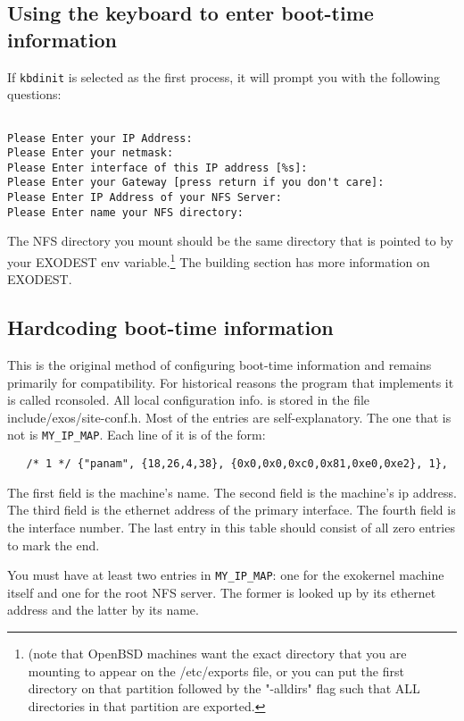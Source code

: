 \documentclass[11pt]{article}
\begin{document}
\subsection{Using the keyboard to enter boot-time information}

If {\tt kbdinit} is selected as the first process, it will prompt
you with the following questions:

\begin{verbatim}

Please Enter your IP Address:
Please Enter your netmask: 
Please Enter interface of this IP address [%s]: 
Please Enter your Gateway [press return if you don't care]: 
Please Enter IP Address of your NFS Server: 
Please Enter name your NFS directory: 

\end{verbatim}

The NFS directory you mount should be the same directory that is
pointed to by your EXODEST env variable.\footnote{(note that OpenBSD
machines want the exact directory that you are mounting to appear on
the /etc/exports file, or you can put the first directory on that
partition followed by the "-alldirs" flag such that ALL directories in
that partition are exported.} The building section has more information
on EXODEST.

\subsection{Hardcoding boot-time information}

This is the original method of configuring boot-time information and
remains primarily for compatibility.  For historical reasons the program
that implements it is called rconsoled. All local configuration info.
is stored in the file include/exos/site-conf.h. Most of the entries
are self-explanatory. The one that is not is {\tt MY\_IP\_MAP}. Each
line of it is of the form:

\begin{verbatim}
   /* 1 */ {"panam", {18,26,4,38}, {0x0,0x0,0xc0,0x81,0xe0,0xe2}, 1},
\end{verbatim}

The first field is the machine's name. The second field is the machine's
ip address. The third field is the ethernet address of the primary
interface. The fourth field is the interface number. The last entry
in this table should consist of all zero entries to mark the end.

You must have at least two entries in {\tt MY\_IP\_MAP}: one for the
exokernel machine itself and one for the root NFS server. The former
is looked up by its ethernet address and the latter by its name.
\end{document}
